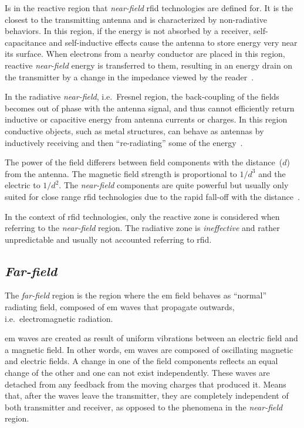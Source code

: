 Is in the reactive region that \emph{near-field} \ac{rfid} technologies are defined for. It is the closest to the transmitting antenna and is characterized by non-radiative behaviors. In this region, if the energy is not absorbed by a receiver, self-capacitance and self-inductive effects cause the antenna to store energy very near its surface. When electrons from a nearby conductor are placed in this region, reactive \emph{near-field} energy is transferred to them, resulting in an energy drain on the transmitter by a change in the impedance viewed by the reader~\cite{finkenzellerRFIDHandbookFundamentals2003, balanisAntennaTheoryAnalysis2005}.

In the radiative \emph{near-field}, i.e.\ Fresnel region, the back-coupling of the fields becomes out of phase with the antenna signal, and thus cannot efficiently return inductive or capacitive energy from antenna currents or charges.
In this region conductive objects, such as metal structures, can behave as antennas by inductively receiving and then ``re-radiating'' some of the energy~\cite{ElectromagneticRadiationField}.

The power of the field differers between field components with the distance~($d$) from the antenna. The magnetic field strength is proportional to $1/d^3$ and the electric to $1/d^2$. The \emph{near-field} components are quite powerful but usually only suited for close range \ac{rfid} technologies due to the rapid fall-off with the distance~\cite{balanisAntennaTheoryAnalysis2005}.

In the context of \ac{rfid} technologies, only the reactive zone is considered when referring to the \emph{near-field} region. The radiative zone is \textit{ineffective} and rather unpredictable and usually not accounted referring to \ac{rfid}.

\subsection{\emph{Far-field}}

The \emph{far-field} region is the region where the \ac{em} field behaves as ``normal'' radiating field, composed of \ac{em} waves that propagate outwards, i.e.\ electromagnetic radiation.

\ac{em} waves are created as result of uniform vibrations between an electric field and a magnetic field. In other words, \ac{em} waves are composed of oscillating magnetic and electric fields. A change in one of the field components reflects an equal change of the other and one can not exist independently.
These waves are detached from any feedback from the moving charges that produced it. Means that, after the waves leave the transmitter, they are completely independent of both transmitter and receiver, as opposed to the phenomena in the \emph{near-field} region.

